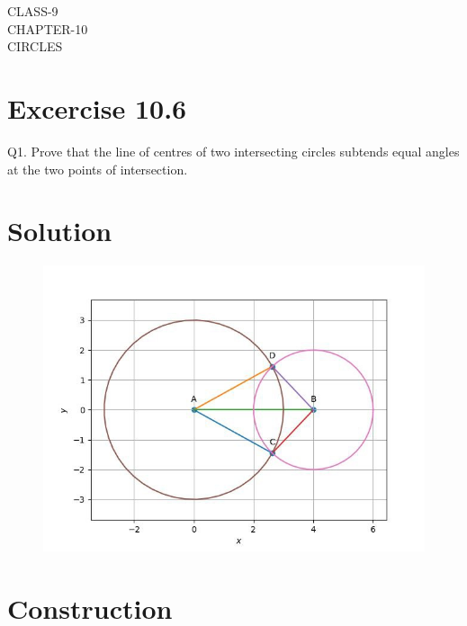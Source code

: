 \documentclass[12pt]{article}
\begin{document}
\begin{center}
\textbf\large{CLASS-9\\CHAPTER-10 \\ CIRCLES}

\end{center}
\section*{Excercise 10.6}

Q1. Prove that the line of centres of two intersecting circles subtends equal angles at the two points of intersection.
\section*{\large Solution}
\begin{figure}[h!]
\centering
\includegraphics[width=\columnwidth]{figs/circle3.png}
\caption{}
\label{fig:Fig1}
\end{figure}

\section*{\large Construction}
\begin{table}[h!]
	\small
	\centering
     
	\label{table:table1}
	\end{table}
\end{document}
